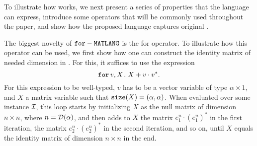 %
%
%
%





To illustrate how \langfor works, we next present a series of properties that the language can express, introduce some operators that will be commonly used throughout the paper, and show how the proposed language captures original \lang.

\medskip

The biggest novelty of $\texttt{for}-\texttt{MATLANG}$ is the for operator. To illustrate how this operator can be used, we first show how one can construct the identity matrix of needed dimension in \langfor. For this, it suffices to use the expression $$\texttt{for}\, v,X \texttt{.}\, X + v\cdot v^*.$$ For this expression to be well-typed, $v$ has to be a vector variable of type $\alpha\times 1$, and $X$ a matrix variable such that $\texttt{size}(X) = (\alpha,\alpha)$. When evaluated over some instance $\mathcal{I}$, this loop starts by initializing $X$ as the null matrix of dimension $n\times n$, where $n=\mathcal{D}(\alpha)$, and then adds to $X$ the matrix $e_1^n\cdot (e_1^n)^*$ in the first iteration, the matrix $e_2^n\cdot (e_2^n)^*$ in the second iteration, and so on, until $X$ equals the identity matrix of dimension $n\times n$ in the end.


